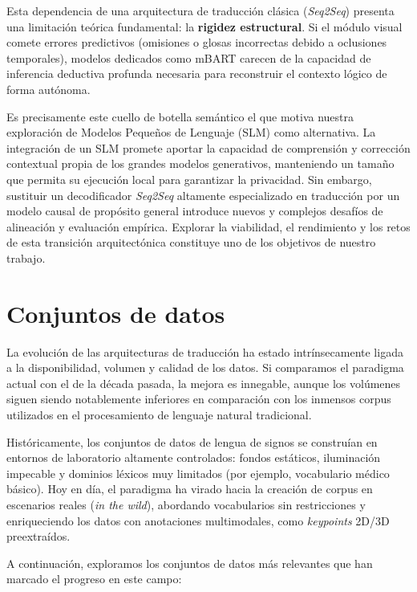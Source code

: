 Esta dependencia de una arquitectura de traducción clásica (\textit{Seq2Seq}) presenta una limitación teórica fundamental: la \textbf{rigidez estructural}.
Si el módulo visual comete errores predictivos (omisiones o glosas incorrectas debido a oclusiones temporales), modelos dedicados como mBART carecen de la capacidad de inferencia deductiva profunda necesaria para reconstruir el contexto lógico de forma autónoma.

Es precisamente este cuello de botella semántico  el que motiva nuestra exploración de Modelos Pequeños de Lenguaje (SLM) como alternativa.
La integración de un SLM promete aportar la capacidad de comprensión y corrección contextual propia de los grandes modelos generativos, manteniendo un tamaño que permita su ejecución local para garantizar la privacidad.
Sin embargo, sustituir un decodificador \textit{Seq2Seq} altamente especializado en traducción por un modelo causal de propósito general introduce nuevos y complejos desafíos de alineación y evaluación empírica.
Explorar la viabilidad, el rendimiento y los retos de esta transición arquitectónica constituye uno de los objetivos de nuestro trabajo.

\section{Conjuntos de datos}
La evolución de las arquitecturas de traducción ha estado intrínsecamente ligada a la disponibilidad, volumen y calidad de los datos.
Si comparamos el paradigma actual con el de la década pasada, la mejora es innegable, aunque los volúmenes siguen siendo notablemente inferiores en comparación con los inmensos corpus utilizados en el procesamiento de lenguaje natural tradicional.

Históricamente, los conjuntos de datos de lengua de signos se construían en entornos de laboratorio altamente controlados: fondos estáticos, iluminación impecable y dominios léxicos muy limitados (por ejemplo, vocabulario médico básico).
Hoy en día, el paradigma ha virado hacia la creación de corpus en escenarios reales (\textit{in the wild}), abordando vocabularios sin restricciones y enriqueciendo los datos con anotaciones multimodales, como \textit{keypoints} 2D/3D preextraídos.

A continuación, exploramos los conjuntos de datos más relevantes que han marcado el progreso en este campo:


